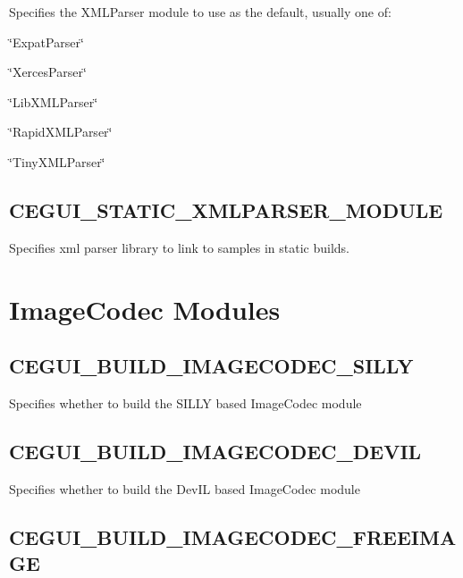 Specifies the X\+M\+L\+Parser module to use as the default, usually one of\+:
\begin{DoxyItemize}
\item \char`\"{}\+Expat\+Parser\char`\"{}
\item \char`\"{}\+Xerces\+Parser\char`\"{}
\item \char`\"{}\+Lib\+X\+M\+L\+Parser\char`\"{}
\item \char`\"{}\+Rapid\+X\+M\+L\+Parser\char`\"{}
\item \char`\"{}\+Tiny\+X\+M\+L\+Parser\char`\"{} 
\end{DoxyItemize}\hypertarget{build_options_build_options_static_parser_lib}{}\subsection{C\+E\+G\+U\+I\+\_\+\+S\+T\+A\+T\+I\+C\+\_\+\+X\+M\+L\+P\+A\+R\+S\+E\+R\+\_\+\+M\+O\+D\+U\+LE}\label{build_options_build_options_static_parser_lib}
Specifies xml parser library to link to samples in static builds.\hypertarget{build_options_build_options_image_codecs}{}\section{Image\+Codec Modules}\label{build_options_build_options_image_codecs}
\hypertarget{build_options_build_options_silly_codec}{}\subsection{C\+E\+G\+U\+I\+\_\+\+B\+U\+I\+L\+D\+\_\+\+I\+M\+A\+G\+E\+C\+O\+D\+E\+C\+\_\+\+S\+I\+L\+LY}\label{build_options_build_options_silly_codec}
Specifies whether to build the S\+I\+L\+LY based Image\+Codec module \hypertarget{build_options_build_options_devil_codec}{}\subsection{C\+E\+G\+U\+I\+\_\+\+B\+U\+I\+L\+D\+\_\+\+I\+M\+A\+G\+E\+C\+O\+D\+E\+C\+\_\+\+D\+E\+V\+IL}\label{build_options_build_options_devil_codec}
Specifies whether to build the Dev\+IL based Image\+Codec module \hypertarget{build_options_build_options_freeimage_codec}{}\subsection{C\+E\+G\+U\+I\+\_\+\+B\+U\+I\+L\+D\+\_\+\+I\+M\+A\+G\+E\+C\+O\+D\+E\+C\+\_\+\+F\+R\+E\+E\+I\+M\+A\+GE}\label{build_options_build_options_freeimage_codec}
